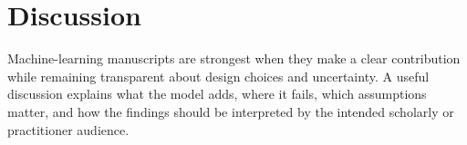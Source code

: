 \section{Discussion}

Machine-learning manuscripts are strongest when they make a clear contribution while remaining transparent about design choices and uncertainty. A useful discussion explains what the model adds, where it fails, which assumptions matter, and how the findings should be interpreted by the intended scholarly or practitioner audience.
